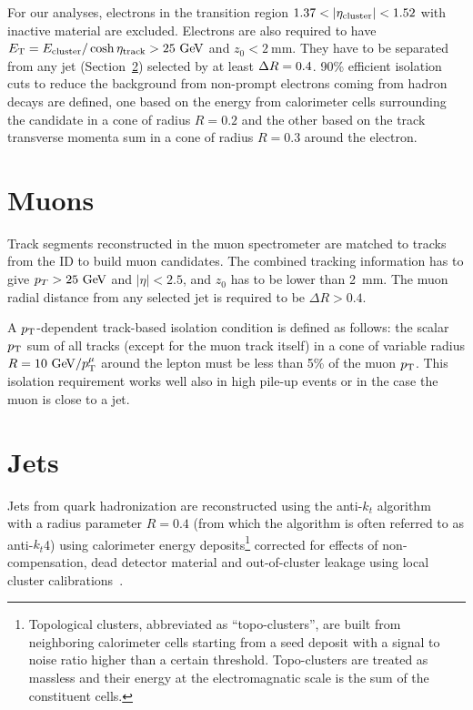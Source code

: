 For our analyses, electrons in the transition region $1.37<|\eta_{\rm cluster}| <1.52$
with inactive material are excluded. Electrons are also required to have 
$\et = E_{\rm cluster}/\cosh\eta_{\rm track} > 25\gev$ and $z_0<2~$mm.
They have to be separated from any jet (Section~\ref{sec:jets}) selected by at least $\dr =0.4$.
90\% efficient isolation cuts to reduce the background from non-prompt electrons coming from
hadron decays are defined, one based on the energy from calorimeter cells surrounding the candidate in
a cone of radius $R=0.2$ and the other based on the track transverse momenta sum in a cone of radius $R=0.3$ around
the electron.

\section{Muons}\label{sec:muons}
Track segments reconstructed in the muon spectrometer are matched to tracks from the ID to build
muon candidates. The combined tracking information has to give $p_T>25\gev$ and $|\eta|<2.5$, and
$z_{0}$ has to be lower than 2~mm.
The muon radial distance from any selected jet is required to be $\Delta R > 0.4$.

A  $\pt$-dependent track-based isolation condition is defined as follows:
the scalar $\pt$ sum of all tracks (except for the muon track itself) 
in a cone of variable radius $R=10\gev/\pt^\mu$ around the lepton
must be less than 5\% of the muon $\pt$.
This isolation requirement works well also in high pile-up events
or in the case the muon is close to a jet.

\section{Jets}\label{sec:jets}

Jets from quark hadronization are reconstructed using the anti-$k_t$
algorithm~\cite{ref:Cacciari2008,ref:Cacciari2006,ref:fastjet} with a
radius parameter $R=0.4$ (from which the algorithm is often referred to as anti-$k_t$4) 
using calorimeter energy deposits\footnote{Topological clusters, abbreviated as ``topo-clusters'', are 
built from neighboring calorimeter cells starting from a seed deposit with a signal to noise ratio
higher than a certain threshold. Topo-clusters are treated as massless and their energy at the electromagnatic 
scale is the sum of the constituent cells.}
corrected for effects of non-compensation,
dead detector material and out-of-cluster leakage using local cluster calibrations~\cite{LCW1,LCW2}.


